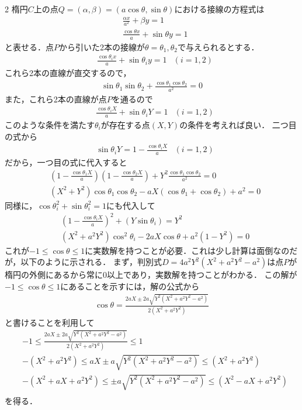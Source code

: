 \documentclass[../../main.tex]{subfiles}
\begin{document}
\begin{multicols}{2}
  楕円$C$上の点$Q=(\alpha,\beta)=(a\cos\theta,\sin\theta)$における接線の方程式は
  \begin{align*}
     & \frac{\alpha x}{a^2} + \beta y = 1        \\
     & \frac{\cos\theta x}{a} + \sin\theta y = 1
  \end{align*}
  と表せる．点$P$から引いた2本の接線が$\theta=\theta_1, \theta_2$で与えられるとする．
  \begin{align*}
     & \frac{\cos\theta_{i} x}{a} + \sin\theta_{i} y = 1 & (i = 1,2)
  \end{align*}
  これら2本の直線が直交するので，
  \begin{align}
    \sin\theta_1\sin\theta_2 + \frac{\cos\theta_1\cos\theta_2}{a^2} = 0
  \end{align}
  また，これら2本の直線が点$P$を通るので
  \begin{align}
     & \frac{\cos\theta_{i} X}{a} + \sin\theta_{i} Y = 1 & (i = 1,2)
  \end{align}
  このような条件を満たす$\theta_i$が存在する点$(X,Y)$の条件を考えれば良い．
  二つ目の式から
  \begin{align}
     & \sin\theta_{i} Y = 1 - \frac{\cos\theta_{i} X}{a} & (i = 1,2)
  \end{align}
  だから，一つ目の式に代入すると
  \begin{align}
     & \left(1 - \frac{\cos\theta_{1} X}{a} \right)\left(1 - \frac{\cos\theta_{2} X}{a} \right) +Y^2\frac{\cos\theta_1\cos\theta_2}{a^2} = 0 \\
     & \left(X^2+Y^2\right)\cos\theta_1\cos\theta_2 -aX(\cos\theta_1+\cos\theta_2) + a^2 = 0
  \end{align}
  同様に，$\cos\theta_{i}^2+\sin\theta_{i}^2=1$にも代入して
  \begin{align}
     & \left(1 - \frac{\cos\theta_{i} X}{a} \right)^2+\left(Y\sin\theta_{i}\right) = Y^2   \\
     & \left(X^2+a^2Y^2\right)\cos^2\theta_{i} - 2aX\cos\theta + a^2\left(1-Y^2\right) = 0
  \end{align}
  これが$-1\le\cos\theta\le 1$に実数解を持つことが必要．これは少し計算は面倒なのだが，以下のように示される．
  まず，判別式$D=4a^2Y^2(X^2+a^2Y^2-a^2)$は点$P$が楕円の外側にあるから常に$0$以上であり，実数解を持つことがわかる．
  この解が$-1\le\cos\theta\le 1$にあることを示すには，解の公式から
  \begin{align*}
    \cos\theta = \frac{2aX\pm 2a\sqrt{Y^2(X^2+a^2Y^2-a^2)}}{2(X^2+a^2Y^2)}
  \end{align*}
  と書けることを利用して
  \begin{align*}
     & -1 \le  \frac{2aX\pm 2a\sqrt{Y^2(X^2+a^2Y^2-a^2)}}{2(X^2+a^2Y^2)} \le 1    \\
     & -(X^2+a^2Y^2) \le aX\pm a\sqrt{Y^2(X^2+a^2Y^2-a^2)} \le (X^2+a^2Y^2)       \\
     & -(X^2+aX+a^2Y^2) \le \pm a\sqrt{Y^2(X^2+a^2Y^2-a^2)} \le (X^2-aX + a^2Y^2) \\
  \end{align*}
  を得る．


\end{multicols}
\end{document}
